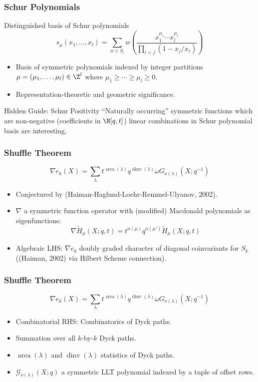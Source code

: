 \documentclass{beamer}
\DeclareMathOperator{\area}{area}
\DeclareMathOperator{\dinv}{dinv}
\newcommand{\Gcal}{\mathcal{G}}
\newcounter{c}
\begin{document}
\begin{frame}
  \frametitle{Schur Polynomials}
  Distinguished basis of Schur polynomials \[
    s_\mu(x_1,\ldots,x_l) = \sum_{w \in S_l}
    w\left(\frac{x_1^{\mu_1}\cdots x_l^{\mu_l}}{\prod_{i<j} (1-x_j/x_i)}  \right)
  \]
  \begin{itemize}\pause
  \item Basis of symmetric polynomials indexed by integer partitions
    \(\mu = (\mu_1,\ldots,\mu_l) \in \Z^l\) where \(\mu_1 \geq \cdots \geq
    \mu_l \geq 0\).\pause
  \item Representation-theoretic and geometric significance.\pause
  \end{itemize}
  \begin{block}{Hidden Guide: Schur Positivity}
    ``Naturally occurring'' symmetric functions which are non-negative
    (coefficients in \(\N[q,t]\))
    linear combinations in Schur polynomial basis
     are interesting.
  \end{block}
\end{frame}
\begin{frame}
  \frametitle{Shuffle Theorem}
  \begin{theorem}
    \[
      \nabla e_k(X) = \sum_\lambda t^{\area(\lambda)}q^{\dinv(\lambda)}
      \omega G_{\nu(\lambda)}(X;q^{-1})
    \]
  \end{theorem}
  \begin{itemize}
  \item Conjectured by (Haiman-Haglund-Loehr-Remmel-Ulyanov, 2002).\pause
  \item \(\nabla\) a symmetric function operator with (modified)
    Macdonald polynomials as eigenfunctions:\[
      \nabla \tilde{H}_\mu(X;q,t) = t^{n(\mu)}q^{n(\mu')} \tilde{H}_\mu(X;q,t)
    \]\pause
  \item Algebraic LHS: \(\nabla e_k\) doubly graded character of diagonal
    coinvariants for \(S_k\) ((Haiman, 2002) via Hilbert Scheme connection).
  \end{itemize}
\end{frame}
\begin{frame}
  \frametitle{Shuffle Theorem}
\begin{theorem}
    \[
      \nabla e_k(X) = \sum_\lambda t^{\area(\lambda)}q^{\dinv(\lambda)}
      \omega G_{\nu(\lambda)}(X;q^{-1})
    \]
  \end{theorem}
  \begin{itemize}
  \item Combinatorial RHS: Combinatorics of Dyck paths. \pause
  \item Summation over all \(k\)-by-\(k\) Dyck paths.\pause
  \item \(\area(\lambda)\) and \(\dinv(\lambda)\) statistics of Dyck paths.\pause
  \item \(\Gcal_{\nu(\lambda)}(X;q)\) a symmetric LLT polynomial
    indexed by a tuple of offset rows.
  \end{itemize}
\end{frame}
\end{document}
